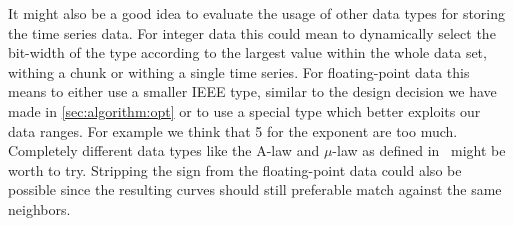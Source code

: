 It might also be a good idea to evaluate the usage of other data types for storing the time series data. For integer data this could mean to dynamically select the bit-width of the type according to the largest value within the whole data set, withing a chunk or withing a single time series. For floating-point data this means to either use a smaller IEEE type, similar to the design decision we have made in \autoref{sec:algorithm:opt} or to use a special type which better exploits our data ranges. For example we think that \SI{5}{\bit} for the exponent are too much. Completely different data types like the A-law and $\mu$-law as defined in~\cite{G711} might be worth to try. Stripping the sign from the floating-point data could also be possible since the resulting curves should still preferable match against the same neighbors.
